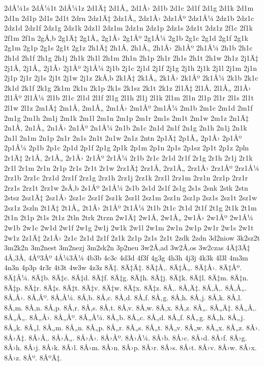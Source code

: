 {2dÅ¼1s
2dÅ¼1t
2dÅ¼1z
2d1Ä‡
2d1Å„
2d1Å›
2d1b
2d1c
2d1f
2d1g
2d1k
2d1m
2d1n
2d1p
2d1s
2d1t
2drn
2dz1Ä‡
2dz1Å„
2dz1Å›
2dz1Åº
2dz1Å¼
2dz1b
2dz1c
2dz1d
2dz1f
2dz1g
2dz1k
2dz1l
2dz1m
2dz1n
2dz1p
2dz1s
2dz1t
2dz1z
2f1c
2f1k
2f1m
2f1n
2gÅ‚b
2g1Ä‡
2g1Å„
2g1Å›
2g1Åº
2g1Å¼
2g1b
2g1c
2g1d
2g1f
2g1k
2g1m
2g1p
2g1s
2g1t
2g1z
2h1Ä‡
2h1Å‚
2h1Å„
2h1Å›
2h1Åº
2h1Å¼
2h1b
2h1c
2h1d
2h1f
2h1g
2h1j
2h1k
2h1l
2h1m
2h1n
2h1p
2h1r
2h1s
2h1t
2h1w
2h1z
2j1Ä‡
2j1Å‚
2j1Å„
2j1Å›
2j1Åº
2j1Å¼
2j1b
2j1c
2j1d
2j1f
2j1g
2j1h
2j1k
2j1l
2j1m
2j1n
2j1p
2j1r
2j1s
2j1t
2j1w
2j1z
2kÅ‚b
2k1Ä‡
2k1Å„
2k1Å›
2k1Åº
2k1Å¼
2k1b
2k1c
2k1d
2k1f
2k1g
2k1m
2k1n
2k1p
2k1s
2k1sz
2k1t
2k1z
2l1Ä‡
2l1Å‚
2l1Å„
2l1Å›
2l1Åº
2l1Å¼
2l1b
2l1c
2l1d
2l1f
2l1g
2l1h
2l1j
2l1k
2l1m
2l1n
2l1p
2l1r
2l1s
2l1t
2l1w
2l1z
2m1Ä‡
2m1Å‚
2m1Å„
2m1Å›
2m1Åº
2m1Å¼
2m1b
2m1c
2m1d
2m1f
2m1g
2m1h
2m1j
2m1k
2m1l
2m1n
2m1p
2m1r
2m1s
2m1t
2m1w
2m1z
2n1Ä‡
2n1Å‚
2n1Å„
2n1Å›
2n1Åº
2n1Å¼
2n1b
2n1c
2n1d
2n1f
2n1g
2n1h
2n1j
2n1k
2n1l
2n1m
2n1p
2n1r
2n1s
2n1t
2n1w
2n1z
2ntn
2p1Ä‡
2p1Å„
2p1Å›
2p1Åº
2p1Å¼
2p1b
2p1c
2p1d
2p1f
2p1g
2p1k
2p1m
2p1n
2p1s
2p1sz
2p1t
2p1z
2pln
2r1Ä‡
2r1Å‚
2r1Å„
2r1Å›
2r1Åº
2r1Å¼
2r1b
2r1c
2r1d
2r1f
2r1g
2r1h
2r1j
2r1k
2r1l
2r1m
2r1n
2r1p
2r1s
2r1t
2r1w
2rz1Ä‡
2rz1Å‚
2rz1Å„
2rz1Å›
2rz1Åº
2rz1Å¼
2rz1b
2rz1c
2rz1d
2rz1f
2rz1g
2rz1h
2rz1j
2rz1k
2rz1l
2rz1m
2rz1n
2rz1p
2rz1r
2rz1s
2rz1t
2rz1w
2sÅ‚b
2s1Åº
2s1Å¼
2s1b
2s1d
2s1f
2s1g
2s1s
2snk
2stk
2stn
2stsz
2sz1Ä‡
2sz1Å›
2sz1c
2sz1f
2sz1k
2sz1l
2sz1m
2sz1n
2sz1p
2sz1s
2sz1t
2sz1w
2sz1z
2szln
2t1Ä‡
2t1Å„
2t1Å›
2t1Åº
2t1Å¼
2t1b
2t1c
2t1d
2t1f
2t1g
2t1k
2t1m
2t1n
2t1p
2t1s
2t1z
2tln
2trk
2trzn
2w1Ä‡
2w1Å‚
2w1Å„
2w1Å›
2w1Åº
2w1Å¼
2w1b
2w1c
2w1d
2w1f
2w1g
2w1j
2w1k
2w1l
2w1m
2w1n
2w1p
2w1r
2w1s
2w1t
2w1z
2z1Ä‡
2z1Å›
2z1c
2z1d
2z1f
2z1k
2z1p
2z1s
2z1t
2zdk
2zdn
3d2niow
3k2sz2t
3m2k2n
3m2nest
3m2nezj
3m2sk2n
3p2neu
3w2Å‚ad
3w2Å‚os
3w2czas
4Ä‡3Ä‡
4Å‚3Å‚
4Åº3Åº
4Å¼3Å¼
4b3b
4c3c
4d3d
4f3f
4g3g
4h3h
4j3j
4k3k
4l3l
4m3m
4n3n
4p3p
4r3r
4t3t
4w3w
4z3z
8Ä‡.
8Ä‡Ä‡.
8Ä‡Å‚.
8Ä‡Å„.
8Ä‡Å›.
8Ä‡Åº.
8Ä‡Å¼.
8Ä‡b.
8Ä‡c.
8Ä‡d.
8Ä‡f.
8Ä‡g.
8Ä‡h.
8Ä‡j.
8Ä‡k.
8Ä‡l.
8Ä‡m.
8Ä‡n.
8Ä‡p.
8Ä‡r.
8Ä‡s.
8Ä‡t.
8Ä‡v.
8Ä‡w.
8Ä‡x.
8Ä‡z.
8Å‚.
8Å‚Ä‡.
8Å‚Å‚.
8Å‚Å„.
8Å‚Å›.
8Å‚Åº.
8Å‚Å¼.
8Å‚b.
8Å‚c.
8Å‚d.
8Å‚f.
8Å‚g.
8Å‚h.
8Å‚j.
8Å‚k.
8Å‚l.
8Å‚m.
8Å‚n.
8Å‚p.
8Å‚r.
8Å‚s.
8Å‚t.
8Å‚v.
8Å‚w.
8Å‚x.
8Å‚z.
8Å„.
8Å„Ä‡.
8Å„Å‚.
8Å„Å„.
8Å„Å›.
8Å„Åº.
8Å„Å¼.
8Å„b.
8Å„c.
8Å„d.
8Å„f.
8Å„g.
8Å„h.
8Å„j.
8Å„k.
8Å„l.
8Å„m.
8Å„n.
8Å„p.
8Å„r.
8Å„s.
8Å„t.
8Å„v.
8Å„w.
8Å„x.
8Å„z.
8Å›.
8Å›Ä‡.
8Å›Å‚.
8Å›Å„.
8Å›Å›.
8Å›Åº.
8Å›Å¼.
8Å›b.
8Å›c.
8Å›d.
8Å›f.
8Å›g.
8Å›h.
8Å›j.
8Å›k.
8Å›l.
8Å›m.
8Å›n.
8Å›p.
8Å›r.
8Å›s.
8Å›t.
8Å›v.
8Å›w.
8Å›x.
8Å›z.
8Åº.
8ÅºÄ‡.
}
